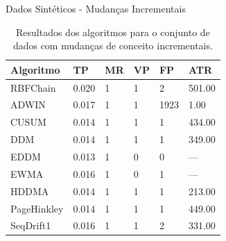 \documentclass[10pt]{beamer}
\begin{document}
\begin{frame}{Dados Sintéticos -  Mudanças Incrementais}
    \begin{table}[ht]
        \centering
        \caption{Resultados dos algoritmos para o conjunto de dados com mudanças de conceito incrementais.}
        \label{tbl:exp4}
        \begin{tabular}{llllll}

        \toprule
        Algoritmo              & TP                     & MR                     & VP                     & FP                     & ATR                    \\
        \midrule
        RBFChain               & 0.020                  & 1                      & 1                      & 2                      & 501.00                 \\
        ADWIN                  & 0.017                  & 1                      & 1                      & 1923                   & 1.00                   \\
        CUSUM                  & 0.014                  & 1                      & 1                      & 1                      & 434.00                 \\
        DDM                    & 0.014                  & 1                      & 1                      & 1                      & 349.00                 \\
        EDDM                   & 0.013                  & 1                      & 0                      & 0                      & ---                    \\
        EWMA                   & 0.016                  & 1                      & 0                      & 1                      & ---                    \\
        HDDMA                  & 0.014                  & 1                      & 1                      & 1                      & 213.00                    \\
        PageHinkley            & 0.014                  & 1                      & 1                      & 1                      & 449.00                 \\
        SeqDrift1              & 0.016                  & 1                      & 1                      & 2                      & 331.00                 \\
        \bottomrule

        \end{tabular}
        \end{table}
\end{frame}
\end{document}
